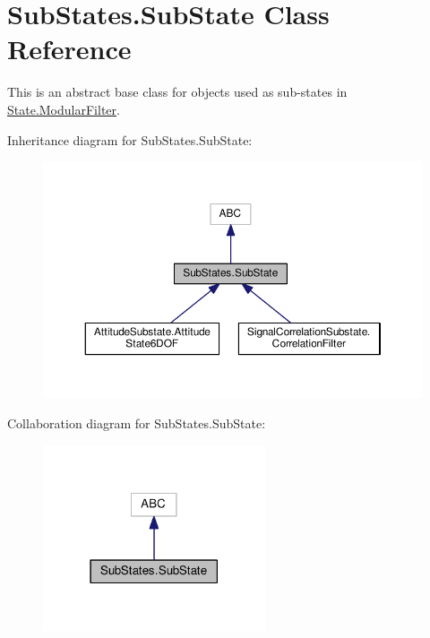 \hypertarget{classSubStates_1_1SubState}{}\section{Sub\+States.\+Sub\+State Class Reference}
\label{classSubStates_1_1SubState}


This is an abstract base class for objects used as sub-\/states in \hyperlink{classState_1_1ModularFilter}{State.\+Modular\+Filter}.  




Inheritance diagram for Sub\+States.\+Sub\+State\+:\nopagebreak
\begin{figure}[H]
\begin{center}
\leavevmode
\includegraphics[width=350pt]{classSubStates_1_1SubState__inherit__graph}
\end{center}
\end{figure}


Collaboration diagram for Sub\+States.\+Sub\+State\+:\nopagebreak
\begin{figure}[H]
\begin{center}
\leavevmode
\includegraphics[width=186pt]{classSubStates_1_1SubState__coll__graph}
\end{center}
\end{figure}
